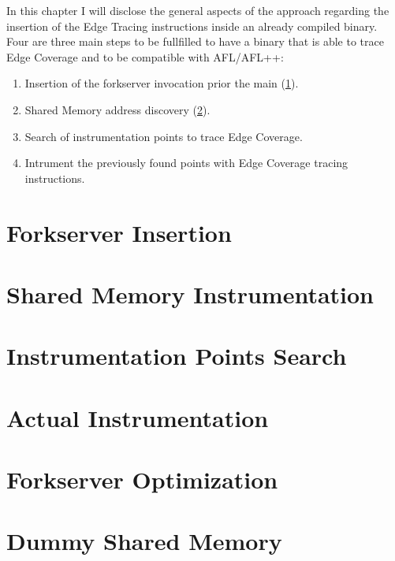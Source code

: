 In this chapter I will disclose the general aspects of the approach regarding the insertion of the Edge Tracing 
instructions inside an already compiled binary.\\
Four are three main steps to be fullfilled to have a binary that is able to trace Edge Coverage and 
    to be compatible with AFL/AFL++:
    \begin{enumerate}
        \item Insertion of the forkserver invocation prior the main (\cref{sec:forkserver_insertion}).
        \item Shared Memory address discovery (\cref{sec:shared_mem}).
        \item Search of instrumentation points to trace Edge Coverage.
        \item Intrument the previously found points with Edge Coverage tracing instructions.
    \end{enumerate}

\section{Forkserver Insertion}\label{sec:forkserver_insertion}
    
\section{Shared Memory Instrumentation}\label{sec:shared_mem}
    
\section{Instrumentation Points Search}\label{sec:instr_point_search}
    
\section{Actual Instrumentation}\label{sec:actual_instrumentation}
    
\section{Forkserver Optimization}\label{sec:optimization}
    
\section{Dummy Shared Memory}\label{sec:dummy_shm}
    